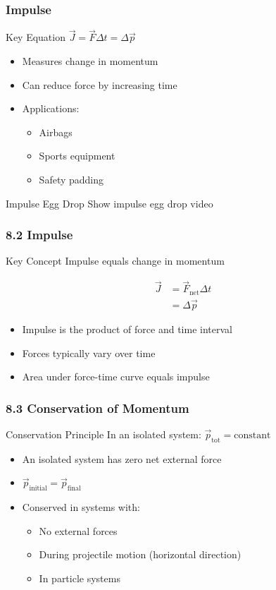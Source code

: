 \documentclass{beamer}
\begin{document}
\begin{frame}
\frametitle{Impulse}
\begin{block}{Key Equation}
$\vec{J} = \vec{F}\Delta t = \Delta \vec{p}$
\end{block}
\begin{itemize}
\item Measures change in momentum
\item Can reduce force by increasing time
\item Applications:
    \begin{itemize}
    \item Airbags
    \item Sports equipment
    \item Safety padding
    \end{itemize}
\end{itemize}
\end{frame}
\begin{frame}{Impulse Egg Drop}
    Show impulse egg drop video
\end{frame}
\begin{frame}
\frametitle{8.2 Impulse}
\begin{block}{Key Concept}
Impulse equals change in momentum
\end{block}

\begin{align*}
\vec{J} &= \vec{F}_{\text{net}}\Delta t \\
&= \Delta \vec{p}
\end{align*}

\begin{itemize}
\item Impulse is the product of force and time interval
\item Forces typically vary over time
\item Area under force-time curve equals impulse
\end{itemize}
\end{frame}

\begin{frame}
\frametitle{8.3 Conservation of Momentum}
\begin{block}{Conservation Principle}
In an isolated system: $\vec{p}_{\text{tot}} = \text{constant}$
\end{block}

\begin{itemize}
\item An isolated system has zero net external force
\item $\vec{p}_{\text{initial}} = \vec{p}_{\text{final}}$
\item Conserved in systems with:
    \begin{itemize}
    \item No external forces
    \item During projectile motion (horizontal direction)
    \item In particle systems
    \end{itemize}
\end{itemize}
\end{frame}
\end{document}
